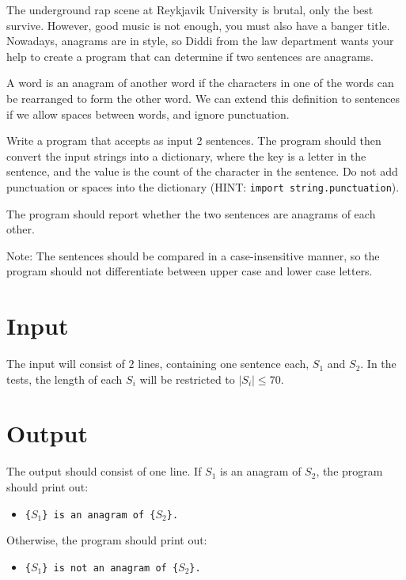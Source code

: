 
The underground rap scene at Reykjavik University is brutal, only the best survive.
However, good music is not enough, you must also have a banger title.
Nowadays, anagrams are in style,
so Diddi from the law department wants your help to create a program
that can determine if two sentences are anagrams.

A word is an anagram of another word
if the characters in one of the words can be rearranged to form the other word.
We can extend this definition to sentences
if we allow spaces between words, and ignore punctuation.

Write a program that accepts as input 2 sentences.
The program should then convert the input strings into a dictionary,
where the key is a letter in the sentence,
and the value is the count of the character in the sentence.
Do not add punctuation or spaces into the dictionary
(HINT: \texttt{import string.punctuation}).

The program should report whether the two sentences are anagrams of each other.

Note: The sentences should be compared in a case-insensitive manner,
so the program should not differentiate between upper case and lower case letters.


\section*{Input}

The input will consist of $2$ lines,
containing one sentence each, $S_1$ and $S_2$.
In the tests, the length of each $S_i$ will be restricted to $|S_i| \leq 70$.


\section*{Output}

The output should consist of one line.
If $S_1$ is an anagram of $S_2$, the program should print out:
\begin{itemize}
    \item
    \texttt{\{$S_1$\} is an anagram of \{$S_2$\}.}
\end{itemize}
Otherwise, the program should print out:
\begin{itemize}
    \item
    \texttt{\{$S_1$\} is not an anagram of \{$S_2$\}.}
\end{itemize}


